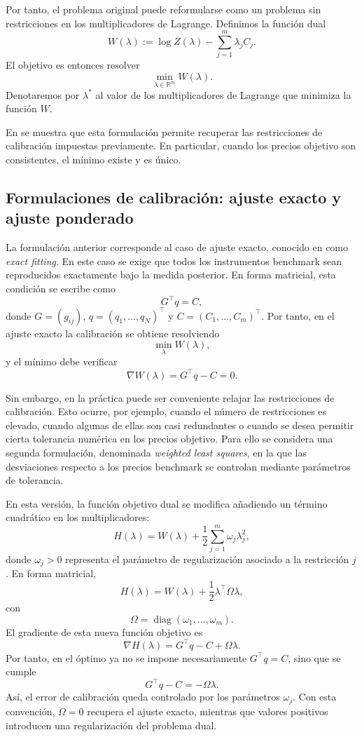 Por tanto, el problema original puede reformularse como un problema sin restricciones en los multiplicadores de Lagrange. Definimos la función dual
\[
W(\lambda)
:=
\log Z(\lambda)
-
\sum_{j=1}^m \lambda_j C_j.
\]
El objetivo es entonces resolver
\[
\min_{\lambda\in\mathbb{R}^m} W(\lambda).
\]
Denotaremos por \(\lambda^*\) al valor de los multiplicadores de Lagrange que minimiza la función \(W\).

En \cite{articleAvellaneda} se muestra que esta formulación permite recuperar las restricciones de calibración impuestas previamente. En particular, cuando los precios objetivo son consistentes, el mínimo existe y es único.

\subsection{Formulaciones de calibración: ajuste exacto y ajuste ponderado}

La formulación anterior corresponde al caso de ajuste exacto, conocido en \cite{articleAvellaneda} como \textit{exact fitting}. En este caso se exige que todos los instrumentos benchmark sean reproducidos exactamente bajo la medida posterior. En forma matricial, esta condición se escribe como
\[
G^\top q=C,
\]
donde \(G=(g_{ij})\), \(q=(q_1,\ldots,q_N)^\top\) y \(C=(C_1,\ldots,C_m)^\top\). Por tanto, en el ajuste exacto la calibración se obtiene resolviendo
\[
\min_{\lambda} W(\lambda),
\]
y el mínimo debe verificar
\[
\nabla W(\lambda)=G^\top q-C=0.
\]

Sin embargo, en la práctica puede ser conveniente relajar las restricciones de calibración. Esto ocurre, por ejemplo, cuando el número de restricciones es elevado, cuando algunas de ellas son casi redundantes o cuando se desea permitir cierta tolerancia numérica en los precios objetivo. Para ello se considera una segunda formulación, denominada \textit{weighted least squares}, en la que las desviaciones respecto a los precios benchmark se controlan mediante parámetros de tolerancia. \medskip

En esta versión, la función objetivo dual se modifica añadiendo un término cuadrático en los multiplicadores:
\[
H(\lambda)
=
W(\lambda)
+
\frac{1}{2}
\sum_{j=1}^m
\omega_j\lambda_j^2,
\]
donde \(\omega_j>0\) representa el parámetro de regularización asociado a la restricción \(j\). En forma matricial,
\[
H(\lambda)
=
W(\lambda)
+
\frac{1}{2}\lambda^\top\Omega\lambda,
\]
con
\[
\Omega=\operatorname{diag}(\omega_1,\ldots,\omega_m).
\]
El gradiente de esta nueva función objetivo es
\[
\nabla H(\lambda)
=
G^\top q-C+\Omega\lambda.
\]
Por tanto, en el óptimo ya no se impone necesariamente \(G^\top q=C\), sino que se cumple
\[
G^\top q-C
=
-\Omega\lambda.
\]
Así, el error de calibración queda controlado por los parámetros \(\omega_j\). Con esta convención, \(\Omega=0\) recupera el ajuste exacto, mientras que valores positivos introducen una regularización del problema dual.

